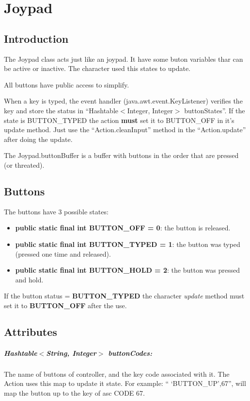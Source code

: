 \chapter{Joypad}
	\section{Introduction}
		The Joypad class acts just like an joypad. It have some buton variables thar can be active or inactive. The character used this states to update.
		
		All buttons have public access to simplify.
		
		When a key is typed, the event handler (java.awt.event.KeyListener) verifies the key and store the status in ``Hashtable$<$Integer, Integer$>$ buttonStates''. If the state is BUTTON\_TYPED the action \textbf{must} set it to BUTTON\_OFF in it's update method. Just use the ``Action.cleanInput'' method in the ``Action.update'' after doing the update.
		
		
		The Joypad.buttonBuffer is a buffer with buttons in the order that are pressed (or  threated).
	\section{Buttons}
		The buttons have 3 possible states:
		\begin{itemize}
			\item \textbf{public static final int BUTTON\_OFF = 0}: the button is released.
			\item \textbf{public static final int BUTTON\_TYPED = 1}: the button was typed (pressed one time and released).
			\item \textbf{public static final int BUTTON\_HOLD = 2}: the button was pressed and hold.
		\end{itemize}
		If the button status = \textbf{BUTTON\_TYPED} the character \emph{update} method must set it to \textbf{BUTTON\_OFF} after the use.
		
	\section{Attributes}
	
	\paragraph{Hashtable$<$String, Integer$>$ buttonCodes: } The name of buttons of controller, and the key code associated with it. The Action uses this map to update it state. For example: `` `BUTTON\_UP',67'', will map the button up to the key of asc CODE 67. 
	
